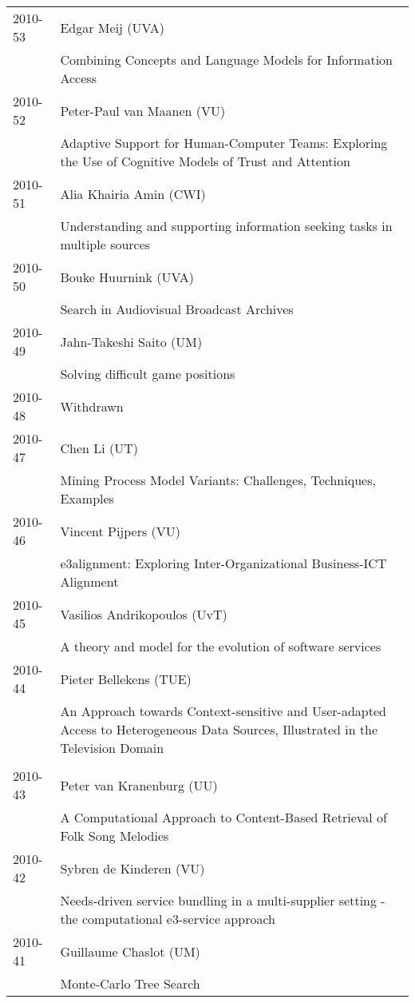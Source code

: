 \begin{longtable}{p{1.25cm}p{10.75cm}}
2010-53 & Edgar Meij (UVA) \\& Combining Concepts and Language Models for Information Access \\
2010-52 & Peter-Paul van Maanen (VU) \\& Adaptive Support for Human-Computer Teams: Exploring the Use of \newline Cognitive Models of Trust and Attention \\
2010-51 & Alia Khairia Amin (CWI) \\& Understanding and supporting information seeking tasks in multiple sources \\
2010-50 & Bouke Huurnink (UVA) \\& Search in Audiovisual Broadcast Archives \\
2010-49 & Jahn-Takeshi Saito (UM) \\& Solving difficult game positions \\
2010-48 & Withdrawn \\
2010-47 & Chen Li (UT) \\& Mining Process Model Variants: Challenges, Techniques, Examples \\
2010-46 & Vincent Pijpers (VU) \\& e3alignment: Exploring Inter-Organizational Business-ICT Alignment \\
2010-45 & Vasilios Andrikopoulos (UvT) \\& A theory and model for the evolution of software services \\
2010-44 & Pieter Bellekens (TUE) \\& An Approach towards Context-sensitive and User-adapted Access to \newline Heterogeneous Data Sources, Illustrated in the Television Domain \\
\\
2010-43 & Peter van Kranenburg (UU) \\& A Computational Approach to Content-Based Retrieval of Folk Song \newline Melodies \\
2010-42 & Sybren de Kinderen (VU) \\& Needs-driven service bundling in a multi-supplier setting - the \newline computational e3-service approach \\
2010-41 & Guillaume Chaslot (UM) \\& Monte-Carlo Tree Search \\

\end{longtable}

